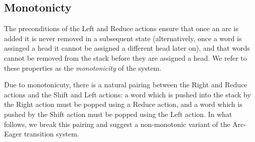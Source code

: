 \documentclass[11pt,letterpaper]{article}
\begin{document}
\subsection{Monotonicty}

The preconditions of the Left and Reduce actions ensure that once an
arc is added it is never removed in a subsequent state (alternatively,
once a word is assinged a head it cannot be assigned a different head
later on), and that words cannot be removed from the stack before they
are assigned a head. We refer to these properties as the
\textit{monotonicity} of the system.

Due to monotonicuty, there is a natural pairing between the Right and
Reduce actions and the Shift and Left actions: a word which is pushed
into the stack by the Right action must be popped using a Reduce
action, and a word which is pushed by the Shift action must be popped
using the Left action.
In what follows, we break this pairing and suggest a non-monotonic
variant of the Arc-Eager transition system.
\end{document}
